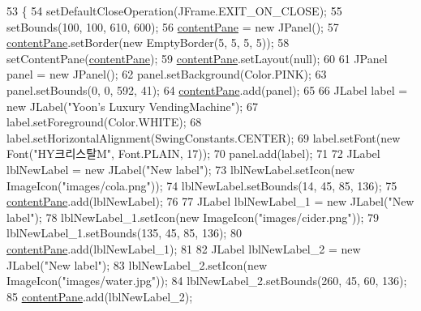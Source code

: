 \begin{DoxyCode}
53                        \{
54         setDefaultCloseOperation(JFrame.EXIT\_ON\_CLOSE);
55         setBounds(100, 100, 610, 600);
56         \hyperlink{class_vending_machine_1_1_machine_u_i_ac8ef25585e46da798d067af0eefa1a03}{contentPane} = \textcolor{keyword}{new} JPanel();
57         \hyperlink{class_vending_machine_1_1_machine_u_i_ac8ef25585e46da798d067af0eefa1a03}{contentPane}.setBorder(\textcolor{keyword}{new} EmptyBorder(5, 5, 5, 5));
58         setContentPane(\hyperlink{class_vending_machine_1_1_machine_u_i_ac8ef25585e46da798d067af0eefa1a03}{contentPane});
59         \hyperlink{class_vending_machine_1_1_machine_u_i_ac8ef25585e46da798d067af0eefa1a03}{contentPane}.setLayout(null);
60         
61         JPanel panel = \textcolor{keyword}{new} JPanel();
62         panel.setBackground(Color.PINK);
63         panel.setBounds(0, 0, 592, 41);
64         \hyperlink{class_vending_machine_1_1_machine_u_i_ac8ef25585e46da798d067af0eefa1a03}{contentPane}.add(panel);
65         
66         JLabel label = \textcolor{keyword}{new} JLabel(\textcolor{stringliteral}{"Yoon's Luxury VendingMachine"});
67         label.setForeground(Color.WHITE);
68         label.setHorizontalAlignment(SwingConstants.CENTER);
69         label.setFont(\textcolor{keyword}{new} Font(\textcolor{stringliteral}{"HY크리스탈M"}, Font.PLAIN, 17));
70         panel.add(label);
71         
72         JLabel lblNewLabel = \textcolor{keyword}{new} JLabel(\textcolor{stringliteral}{"New label"});
73         lblNewLabel.setIcon(\textcolor{keyword}{new} ImageIcon(\textcolor{stringliteral}{"images/cola.png"}));
74         lblNewLabel.setBounds(14, 45, 85, 136);
75         \hyperlink{class_vending_machine_1_1_machine_u_i_ac8ef25585e46da798d067af0eefa1a03}{contentPane}.add(lblNewLabel);
76         
77         JLabel lblNewLabel\_1 = \textcolor{keyword}{new} JLabel(\textcolor{stringliteral}{"New label"});
78         lblNewLabel\_1.setIcon(\textcolor{keyword}{new} ImageIcon(\textcolor{stringliteral}{"images/cider.png"}));
79         lblNewLabel\_1.setBounds(135, 45, 85, 136);
80         \hyperlink{class_vending_machine_1_1_machine_u_i_ac8ef25585e46da798d067af0eefa1a03}{contentPane}.add(lblNewLabel\_1);
81         
82         JLabel lblNewLabel\_2 = \textcolor{keyword}{new} JLabel(\textcolor{stringliteral}{"New label"});
83         lblNewLabel\_2.setIcon(\textcolor{keyword}{new} ImageIcon(\textcolor{stringliteral}{"images/water.jpg"}));
84         lblNewLabel\_2.setBounds(260, 45, 60, 136);
85         \hyperlink{class_vending_machine_1_1_machine_u_i_ac8ef25585e46da798d067af0eefa1a03}{contentPane}.add(lblNewLabel\_2);

\end{DoxyCode}
